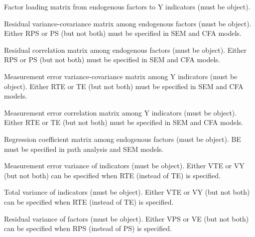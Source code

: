 \documentclass[a4paper]{book}
\begin{document}
\begin{Arguments}
\begin{ldescription}
\item[\code{LY}] 
Factor loading matrix from endogenous factors to Y indicators (must be  object).

\item[\code{PS}] 
Residual variance-covariance matrix among endogenous factors (must be  object). Either RPS or PS (but not both) must be specified in SEM and CFA models.

\item[\code{RPS}] 
Residual correlation matrix among endogenous factors (must be  object). Either RPS or PS (but not both) must be specified in SEM and CFA models.

\item[\code{TE}] 
Measurement error variance-covariance matrix among Y indicators (must be  object). Either RTE or TE (but not both) must be specified in SEM and CFA models.

\item[\code{RTE}] 
Measurement error correlation matrix among Y indicators (must be  object). Either RTE or TE (but not both) must be specified in SEM and CFA models.

\item[\code{BE}] 
Regression coefficient matrix among endogenous factors (must be  object). BE must be specified in path analysis and SEM models. 

\item[\code{VTE}] 
Measurement error variance of indicators (must be  object). Either VTE or VY (but not both) can be specified when RTE (instead of TE) is specified.

\item[\code{VY}] 
Total variance of indicators (must be  object). Either VTE or VY (but not both) can be specified when RTE (instead of TE) is specified.

\item[\code{VPS}] 
Residual variance of factors (must be  object). Either VPS or VE (but not both) can be specified when RPS (instead of PS) is specified.


\end{ldescription}
\end{Arguments}
\end{document}
